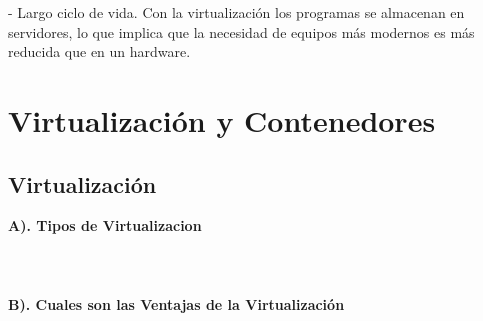 \documentclass[twoside,twocolumn]{article}
\begin{document}
\begin{flushright}
\begin{itemize}
- Largo ciclo de vida. Con la virtualización los programas se almacenan en servidores, lo que implica que la necesidad de equipos más modernos es más reducida que en un hardware.











\section{Virtualización y Contenedores}

\subsection{Virtualización}


 \textbf{A). Tipos de Virtualizacion }\\
\textbf{}\\
\textbf{}\\
\textbf{}\\
 \textbf{B). Cuales son las Ventajas de la Virtualización}\\






\end{itemize}
\end{flushright}
\end{document}
